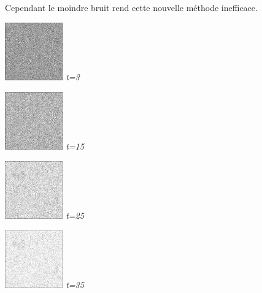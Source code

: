 \documentclass[a4,12pt]{article}
\begin{document}
Cependant le moindre bruit rend cette nouvelle méthode inefficace.\\
\noindent
\begin{minipage}[c]{0.10\linewidth}
	\begin{center}
		\includegraphics[width = 25mm]{./img/p2test_grad_fin_globules10_t3.jpg}
		\textit{t=3}
	\end{center}
\end{minipage}
\begin{minipage}[c]{0.10\linewidth}
	\begin{center}
		\includegraphics[width = 25mm]{./img/p2test_grad_fin_globules10_t15.jpg}
		\textit{t=15}
	\end{center}
\end{minipage}
\begin{minipage}[c]{0.10\linewidth}
	\begin{center}
		\includegraphics[width = 25mm]{./img/p2test_grad_fin_globules10_t25.jpg}
		\textit{t=25}
	\end{center}
\end{minipage}
\begin{minipage}[c]{0.10\linewidth}
	\begin{center}
		\includegraphics[width = 25mm]{./img/p2test_grad_fin_globules10_t35.jpg}
		\textit{t=35}
	\end{center}
\end{minipage}
\end{document}
